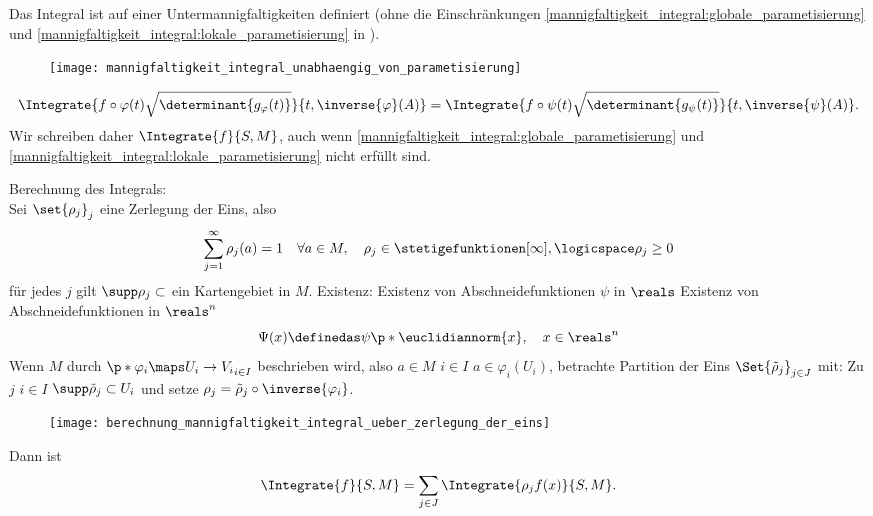 \begin{folgerung}\label{berechnung_mannigfaltigkeit_integral_ueber_zerlegung_der_eins}
  Das Integral ist auf einer Untermannigfaltigkeiten definiert (ohne die Einschränkungen \ref{mannigfaltigkeit_integral:globale_parametisierung} und \ref{mannigfaltigkeit_integral:lokale_parametisierung} in ).
  \begin{figure}[H]
    \centering
    \texttt{[image: mannigfaltigkeit\_integral\_unabhaengig\_von\_parametisierung]}
    \label{fig:mannigfaltigkeit_integral_unabhaengig_von_parametisierung}
  \end{figure}
  \begin{equation*}
    \Integrate{f\circ \varphi(t)\sqrt{\determinant{g_{\varphi}(t)}}}{t,\inverse{\varphi}(A)}=\Integrate{f\circ \psi(t)\sqrt{\determinant{g_{\psi}(t)}}}{t,\inverse{\psi}(A)}.
  \end{equation*}
  Wir schreiben daher \( \Integrate{f}{S,M} \), auch wenn \ref{mannigfaltigkeit_integral:globale_parametisierung} und \ref{mannigfaltigkeit_integral:lokale_parametisierung} nicht erfüllt sind. 

  Berechnung des Integrals:\\
  Sei \( \set{\rho_j}_j \) eine Zerlegung der Eins, also
  \begin{equation*}
    \sum_{j=1}^{\infty}\rho_j(a)=1 \quad \forall a\in M,\quad \rho_j\in \stetigefunktionen[\infty], \logicspace\rho_j\geq 0
  \end{equation*}
  \sd für jedes \( j \) gilt \( \supp \rho_j\subset  \) ein Kartengebiet in \( M \).
  Existenz: Existenz von Abschneidefunktionen \( \psi \) in \( \reals \) \timplies Existenz von Abschneidefunktionen in \( \reals^n \)
  \begin{equation}
    \Psi(x)\definedas \psi\p*{\euclidiannorm{x}},\quad x\in \reals^n
  \end{equation}
  \timplies Wenn \( M \) durch 
  \( \p*{\varphi_i\maps U_i\to V_i}_{i\in I} \)
   beschrieben wird,
    also \tforall \( a\in M \) \texists \( i\in I \) \sd \( a\in \varphi_i(U_i) \), betrachte Partition der Eins \( \Set{\tilde{\rho}_j}_{j\in J} \) mit: Zu \( j \) \texists \( i\in I \) \sd \( \supp \tilde{\rho}_j\subset U_i \) und setze \( \rho_j=\tilde{\rho}_j\circ \inverse{\varphi_i} \).
  \begin{figure}[H]
    \centering
    \texttt{[image: berechnung\_mannigfaltigkeit\_integral\_ueber\_zerlegung\_der\_eins]}
    \label{fig:berechnung_mannigfaltigkeit_integral_ueber_zerlegung_der_eins}
  \end{figure}
  Dann ist 
  \begin{equation*}
    \Integrate{f}{S,M}=\sum_{j\in J} \Integrate{\rho_j f(x)}{S,M}.
  \end{equation*}
\end{folgerung}
